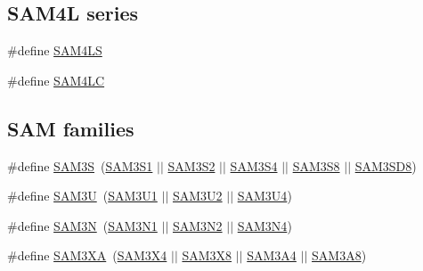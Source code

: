\subsection*{S\-A\-M4\-L series}
\begin{DoxyCompactItemize}
\item 
\#define \hyperlink{group__sam__part__macros__group_gafd288e34365d8a47cadf64f9040b97c6}{S\-A\-M4\-L\-S}
\item 
\#define \hyperlink{group__sam__part__macros__group_gaff053c1dc2a1aaf1e97428da4cb49704}{S\-A\-M4\-L\-C}
\end{DoxyCompactItemize}
\subsection*{S\-A\-M families}
\begin{DoxyCompactItemize}
\item 
\#define \hyperlink{group__sam__part__macros__group_gaaa8d9ee5981c67997fbdf923247bcb68}{S\-A\-M3\-S}~(\hyperlink{group__sam__part__macros__group_gac1f138c6fe48b20faa71fb2d68d68b52}{S\-A\-M3\-S1} $|$$|$ \hyperlink{group__sam__part__macros__group_ga3665c1cc7fa5ad33231fde9e16b562cd}{S\-A\-M3\-S2} $|$$|$ \hyperlink{group__sam__part__macros__group_gae92413f616568bd2f38622e20f4925e0}{S\-A\-M3\-S4} $|$$|$ \hyperlink{group__sam__part__macros__group_gaea8f1cca303520385d12110ad8e8bafe}{S\-A\-M3\-S8} $|$$|$ \hyperlink{group__sam__part__macros__group_ga9f16069247b2e38ddb0bcaa912750a4f}{S\-A\-M3\-S\-D8})
\item 
\#define \hyperlink{group__sam__part__macros__group_ga987abac1ef39b0b447b8b11419942476}{S\-A\-M3\-U}~(\hyperlink{group__sam__part__macros__group_gae39c5d03b1af93b2864e5f72908a0ff3}{S\-A\-M3\-U1} $|$$|$ \hyperlink{group__sam__part__macros__group_ga0feb884f39921517436f269c86914cb0}{S\-A\-M3\-U2} $|$$|$ \hyperlink{group__sam__part__macros__group_ga2af1cda107cbae1f393bce7a6c659a98}{S\-A\-M3\-U4})
\item 
\#define \hyperlink{group__sam__part__macros__group_ga52239420b96aa3f1a273665cfd3b60a1}{S\-A\-M3\-N}~(\hyperlink{group__sam__part__macros__group_gaf58a7d141f31d6db97223dfd62d92905}{S\-A\-M3\-N1} $|$$|$ \hyperlink{group__sam__part__macros__group_ga96514eddac4935925994ef85ca9d12ac}{S\-A\-M3\-N2} $|$$|$ \hyperlink{group__sam__part__macros__group_ga1d47bffd90ddbb0dac3874edbafb3803}{S\-A\-M3\-N4})
\item 
\#define \hyperlink{group__sam__part__macros__group_gaae4990dfaa4eeed17d8a0351cca02fdd}{S\-A\-M3\-X\-A}~(\hyperlink{group__sam__part__macros__group_ga735357bdbbd05356a7829e517fb4203f}{S\-A\-M3\-X4} $|$$|$ \hyperlink{group__sam__part__macros__group_ga13be8353e38999aaca5c412c895c15da}{S\-A\-M3\-X8} $|$$|$ \hyperlink{group__sam__part__macros__group_ga1f4481b0cd1b2c1a4636999b6a433b9f}{S\-A\-M3\-A4} $|$$|$ \hyperlink{group__sam__part__macros__group_gab1397a5e346af96e5ed34027ed3b4de8}{S\-A\-M3\-A8})
$$
\end{DoxyCompactItemize}
